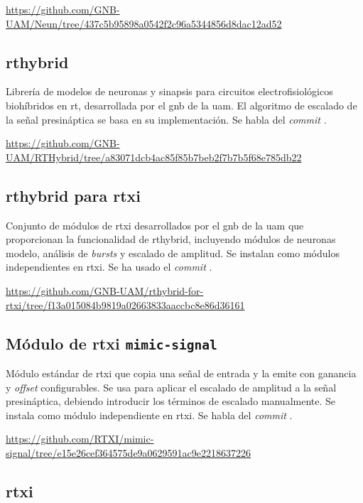 \url{https://github.com/GNB-UAM/Neun/tree/437c5b95898a0542f2c96a5344856d8dac12ad52}


\subsection{\acs{rthybrid}\label{SEC:RTHYBRIDREPO}}

Librería de modelos de neuronas y sinapsis para circuitos electrofisiológicos biohíbridos en \ac{rt}, desarrollada por el \ac{gnb} de la \ac{uam}. El algoritmo de escalado de la señal presináptica se basa en su implementación. Se habla del \textit{commit} \texttt{}.

\url{https://github.com/GNB-UAM/RTHybrid/tree/a83071dcb4ac85f85b7beb2f7b7b5f68e785db22}


\subsection{\acs{rthybrid} para \acs{rtxi}\label{SEC:RTXIPLUGINSGNB}}

Conjunto de módulos de \ac{rtxi} desarrollados por el \ac{gnb} de la \ac{uam} que proporcionan la funcionalidad de \ac{rthybrid}, incluyendo módulos de neuronas modelo, análisis de \textit{bursts} y escalado de amplitud. Se instalan como módulos independientes en \ac{rtxi}. Se ha usado el \textit{commit} \texttt{}.

\url{https://github.com/GNB-UAM/rthybrid-for-rtxi/tree/f13a015084b9819a02663833aaccbc8e86d36161}


\subsection{Módulo de \acs{rtxi} \texttt{mimic-signal}\label{SEC:MIMICSIGNALREPO}}

Módulo estándar de \ac{rtxi} que copia una señal de entrada y la emite con ganancia y \textit{offset} configurables. Se usa para aplicar el escalado de amplitud a la señal presináptica, debiendo introducir los términos de escalado manualmente. Se instala como módulo independiente en \ac{rtxi}. Se habla del \textit{commit} \texttt{}.

\url{https://github.com/RTXI/mimic-signal/tree/e15e26cef364575de9a0629591ac9e2218637226}


\subsection{\acs{rtxi}\label{SEC:RTXIREPO}}

